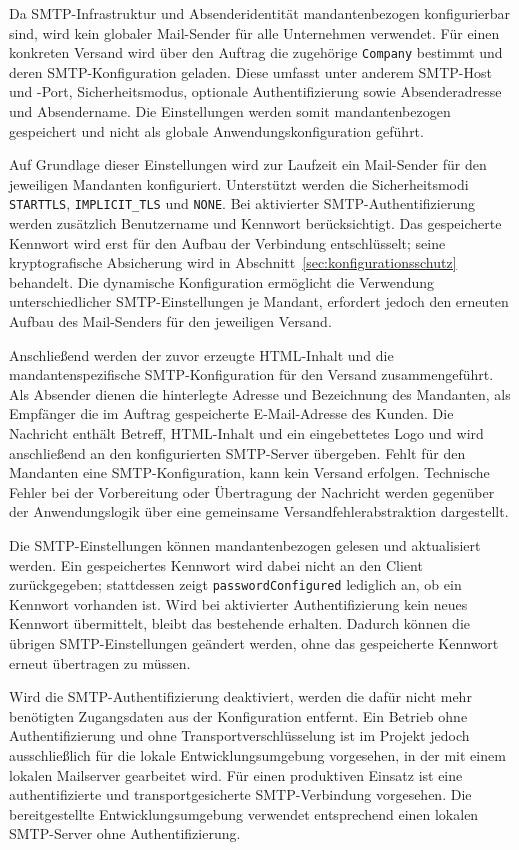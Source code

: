 \documentclass[
  12pt,
  a4paper,
  oneside
]{article}
\begin{document}
Da SMTP-Infrastruktur und Absenderidentität mandantenbezogen konfigurierbar
sind, wird kein globaler Mail-Sender für alle Unternehmen verwendet. Für einen
konkreten Versand wird über den Auftrag die zugehörige \texttt{Company}
bestimmt und deren SMTP-Konfiguration geladen. Diese umfasst unter anderem
SMTP-Host und -Port, Sicherheitsmodus, optionale Authentifizierung sowie
Absenderadresse und Absendername. Die Einstellungen werden somit
mandantenbezogen gespeichert und nicht als globale Anwendungskonfiguration
geführt.

Auf Grundlage dieser Einstellungen wird zur Laufzeit ein Mail-Sender für den
jeweiligen Mandanten konfiguriert. Unterstützt werden die Sicherheitsmodi
\texttt{STARTTLS}, \texttt{IMPLICIT\_TLS} und \texttt{NONE}. Bei aktivierter
SMTP-Authentifizierung werden zusätzlich Benutzername und Kennwort
berücksichtigt. Das gespeicherte Kennwort wird erst für den Aufbau der
Verbindung entschlüsselt; seine kryptografische Absicherung wird in
Abschnitt~\ref{sec:konfigurationsschutz} behandelt. Die dynamische
Konfiguration ermöglicht die Verwendung unterschiedlicher SMTP-Einstellungen
je Mandant, erfordert jedoch den erneuten Aufbau des Mail-Senders für den
jeweiligen Versand.

Anschließend werden der zuvor erzeugte HTML-Inhalt und die
mandantenspezifische SMTP-Konfiguration für den Versand zusammengeführt. Als
Absender dienen die hinterlegte Adresse und Bezeichnung des Mandanten, als
Empfänger die im Auftrag gespeicherte E-Mail-Adresse des Kunden. Die Nachricht
enthält Betreff, HTML-Inhalt und ein eingebettetes Logo und wird anschließend
an den konfigurierten SMTP-Server übergeben. Fehlt für den Mandanten eine
SMTP-Konfiguration, kann kein Versand erfolgen. Technische Fehler bei der
Vorbereitung oder Übertragung der Nachricht werden gegenüber der
Anwendungslogik über eine gemeinsame Versandfehlerabstraktion dargestellt.

Die SMTP-Einstellungen können mandantenbezogen gelesen und aktualisiert werden.
Ein gespeichertes Kennwort wird dabei nicht an den Client zurückgegeben;
stattdessen zeigt \texttt{passwordConfigured} lediglich an, ob ein Kennwort
vorhanden ist. Wird bei aktivierter Authentifizierung kein neues Kennwort
übermittelt, bleibt das bestehende erhalten. Dadurch können die übrigen
SMTP-Einstellungen geändert werden, ohne das gespeicherte Kennwort erneut
übertragen zu müssen.

Wird die SMTP-Authentifizierung deaktiviert, werden die dafür nicht mehr
benötigten Zugangsdaten aus der Konfiguration entfernt. Ein Betrieb ohne
Authentifizierung und ohne Transportverschlüsselung ist im Projekt jedoch
ausschließlich für die lokale Entwicklungsumgebung vorgesehen, in der mit
einem lokalen Mailserver gearbeitet wird. Für einen produktiven Einsatz ist
eine authentifizierte und transportgesicherte SMTP-Verbindung vorgesehen. Die
bereitgestellte Entwicklungsumgebung verwendet entsprechend einen lokalen
SMTP-Server ohne Authentifizierung.
\end{document}

